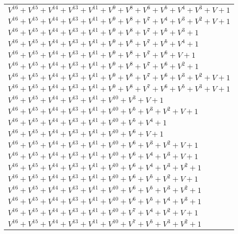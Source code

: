 \documentclass[12pt]{article}
\begin{document}
\begin{adjustwidth}{-4cm}{}
\begin{center}
\begin{longtable}{|l|}
$V^{16}  +V^{15}  +V^{14}  +V^{13}  +V^{11}  +V^{9}  +V^{8}  +V^{6}  +V^{5}  +V^{4}  +V^{3}  + V + 1$ \\
$V^{16}  +V^{15}  +V^{14}  +V^{13}  +V^{11}  +V^{9}  +V^{8}  +V^{7}  +V^{4}  +V^{3}  +V^{2}  + V + 1$ \\
$V^{16}  +V^{15}  +V^{14}  +V^{13}  +V^{11}  +V^{9}  +V^{8}  +V^{7}  +V^{5}  +V^{3}  + 1$ \\
$V^{16}  +V^{15}  +V^{14}  +V^{13}  +V^{11}  +V^{9}  +V^{8}  +V^{7}  +V^{5}  +V^{4}  + 1$ \\
$V^{16}  +V^{15}  +V^{14}  +V^{13}  +V^{11}  +V^{9}  +V^{8}  +V^{7}  +V^{6}  + V + 1$ \\
$V^{16}  +V^{15}  +V^{14}  +V^{13}  +V^{11}  +V^{9}  +V^{8}  +V^{7}  +V^{6}  +V^{2}  + 1$ \\
$V^{16}  +V^{15}  +V^{14}  +V^{13}  +V^{11}  +V^{9}  +V^{8}  +V^{7}  +V^{6}  +V^{3}  +V^{2}  + V + 1$ \\
$V^{16}  +V^{15}  +V^{14}  +V^{13}  +V^{11}  +V^{9}  +V^{8}  +V^{7}  +V^{6}  +V^{5}  +V^{3}  + V + 1$ \\
$V^{16}  +V^{15}  +V^{14}  +V^{13}  +V^{11}  +V^{10}  +V^{3}  + V + 1$ \\
$V^{16}  +V^{15}  +V^{14}  +V^{13}  +V^{11}  +V^{10}  +V^{5}  +V^{3}  +V^{2}  + V + 1$ \\
$V^{16}  +V^{15}  +V^{14}  +V^{13}  +V^{11}  +V^{10}  +V^{5}  +V^{4}  + 1$ \\
$V^{16}  +V^{15}  +V^{14}  +V^{13}  +V^{11}  +V^{10}  +V^{6}  + V + 1$ \\
$V^{16}  +V^{15}  +V^{14}  +V^{13}  +V^{11}  +V^{10}  +V^{6}  +V^{3}  +V^{2}  + V + 1$ \\
$V^{16}  +V^{15}  +V^{14}  +V^{13}  +V^{11}  +V^{10}  +V^{6}  +V^{4}  +V^{3}  + V + 1$ \\
$V^{16}  +V^{15}  +V^{14}  +V^{13}  +V^{11}  +V^{10}  +V^{6}  +V^{4}  +V^{3}  +V^{2}  + 1$ \\
$V^{16}  +V^{15}  +V^{14}  +V^{13}  +V^{11}  +V^{10}  +V^{6}  +V^{5}  +V^{2}  + V + 1$ \\
$V^{16}  +V^{15}  +V^{14}  +V^{13}  +V^{11}  +V^{10}  +V^{6}  +V^{5}  +V^{3}  +V^{2}  + 1$ \\
$V^{16}  +V^{15}  +V^{14}  +V^{13}  +V^{11}  +V^{10}  +V^{6}  +V^{5}  +V^{4}  +V^{3}  + 1$ \\
$V^{16}  +V^{15}  +V^{14}  +V^{13}  +V^{11}  +V^{10}  +V^{7}  +V^{4}  +V^{2}  + V + 1$ \\
$V^{16}  +V^{15}  +V^{14}  +V^{13}  +V^{11}  +V^{10}  +V^{7}  +V^{5}  +V^{3}  +V^{2}  + 1$ \\

\end{longtable}
\end{center}
\end{adjustwidth}
\end{document}
